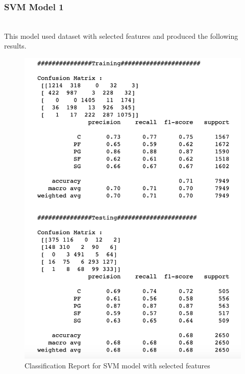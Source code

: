 \documentclass[format=sigconf]{acmart}
\begin{document}
\subsubsection{SVM Model 1}
\hfill\\
This model used dataset with selected features and produced the following results.
\begin{figure}[h]
    \centering
    \includegraphics[scale=0.40]{SVM-Model-2-1-selected-features.png}
    \caption{Classification Report for SVM model with selected features}
    \label{fig:svmmodel21}
\end{figure}
\newpage
\end{document}
